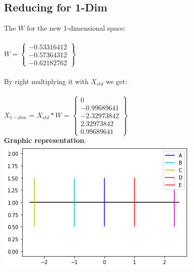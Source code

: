 \subsection{Reducing for 1-Dim}
The $W$ for the new 1-dimensional space:\\
\\
$W = \begin{Bmatrix}
-0.53316412\\
-0.57364312\\
-0.62182762
\end{Bmatrix}$\\
\\
By right multiplying it with $X_{std}$ we get:\\ 
\\
$X_{1-dim}$ = $X_{std}*W$ = $\begin{Bmatrix}
0\\
-0.99689641\\
-2.32973842\\
2.32973842\\
0.99689641
\end{Bmatrix}$
\\
\textbf{Graphic representation}:
\\
\includegraphics[scale = 0.8, width=\textwidth]{graphic1}




